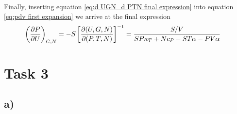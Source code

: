 \documentclass[reprint,english,notitlepage,aps,nobalancelastpage,nofootinbib]{revtex4-1}
\newcommand{\closed}[1]{\left(#1\right)}
\newcommand{\bracket}[1]{\left[#1\right]}
\newcommand{\kt}{\kappa_T}
\renewcommand{\cp}{c_P}
\renewcommand{\a}{\alpha}
\newcommand{\tmdv}[4]{\closed{\pdv{#1}{#2}}_{#3,#4}}
\newcommand{\jacobian}[2]{\pdv{(#1)}{(#2)}}
\begin{document}
Finally, inserting equation \eqref{eq:d UGN_d PTN final expression} into equation \eqref{eq:pdv first expansion} we arrive at the final expression 
\begin{align}
	\tmdv{P}{U}{G}{N} &= -S \bracket{\jacobian{U,G,N}{P,T,N}}^{-1} = \frac{S/V}{SP\kt + N\cp -ST\a - PV\a}
\end{align}


\section*{\large Task 3}
 


\subsection*{a)}
\end{document}
